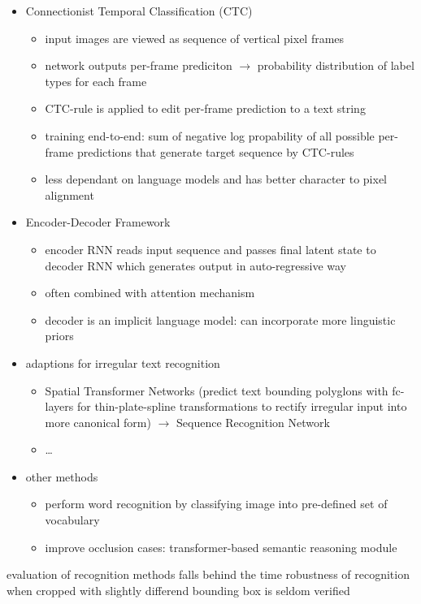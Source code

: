 \begin{itemize}
    \item Connectionist Temporal Classification (CTC)
        \begin{itemize}
            \item input images are viewed as sequence of vertical pixel frames
            \item network outputs per-frame prediciton $\rightarrow$ probability distribution of
                label types for each frame
            \item CTC-rule is applied to edit per-frame prediction to a text string
            \item training end-to-end: sum of negative log propability of all possible per-frame
                predictions that generate target sequence by CTC-rules
            \item less dependant on language models and has better character to pixel alignment
        \end{itemize}
    \item Encoder-Decoder Framework
        \begin{itemize}
            \item encoder RNN reads input sequence and passes final latent state to decoder RNN
                which generates output in auto-regressive way
            \item often combined with attention mechanism
            \item decoder is an implicit language model: can incorporate more linguistic priors
        \end{itemize}
    \item adaptions for irregular text recognition
        \begin{itemize}
            \item Spatial Transformer Networks (predict text bounding polyglons with fc-layers for
                thin-plate-spline transformations to rectify irregular input into more canonical form)
                $\rightarrow$ Sequence Recognition Network
            \item \ldots
        \end{itemize}
    \item other methods
        \begin{itemize}
            \item perform word recognition by classifying image into pre-defined set of vocabulary
            \item improve occlusion cases: transformer-based semantic reasoning module
        \end{itemize}
\end{itemize}
evaluation of recognition methods falls behind the time robustness of recognition when cropped
with slightly differend bounding box is seldom verified

